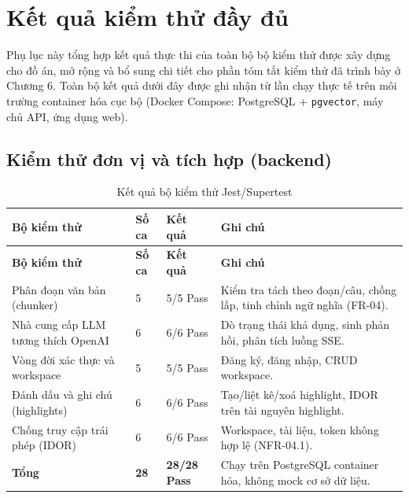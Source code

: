 \chapter{Kết quả kiểm thử đầy đủ}
Phụ lục này tổng hợp kết quả thực thi của toàn bộ bộ kiểm thử được xây dựng cho đồ án, mở rộng và bổ sung chi tiết cho phần tóm tắt kiểm thử đã trình bày ở Chương 6. Toàn bộ kết quả dưới đây được ghi nhận từ lần chạy thực tế trên môi trường container hóa cục bộ (Docker Compose: PostgreSQL + \texttt{pgvector}, máy chủ API, ứng dụng web).

\section{Kiểm thử đơn vị và tích hợp (backend)}
\begin{longtable}{|L{0.30\textwidth}|C{0.12\textwidth}|C{0.12\textwidth}|L{0.32\textwidth}|}
\caption{Kết quả bộ kiểm thử Jest/Supertest}\label{tab:appendix-unit-tests}\\
\hline
\textbf{Bộ kiểm thử} & \textbf{Số ca} & \textbf{Kết quả} & \textbf{Ghi chú} \\\hline
\endfirsthead
\hline
\textbf{Bộ kiểm thử} & \textbf{Số ca} & \textbf{Kết quả} & \textbf{Ghi chú} \\\hline
\endhead
Phân đoạn văn bản (chunker) & 5 & 5/5 Pass & Kiểm tra tách theo đoạn/câu, chồng lấp, tinh chỉnh ngữ nghĩa (FR-04). \\\hline
Nhà cung cấp LLM tương thích OpenAI & 6 & 6/6 Pass & Dò trạng thái khả dụng, sinh phản hồi, phân tích luồng SSE. \\\hline
Vòng đời xác thực và workspace & 5 & 5/5 Pass & Đăng ký, đăng nhập, CRUD workspace. \\\hline
Đánh dấu và ghi chú (highlights) & 6 & 6/6 Pass & Tạo/liệt kê/xoá highlight, IDOR trên tài nguyên highlight. \\\hline
Chống truy cập trái phép (IDOR) & 6 & 6/6 Pass & Workspace, tài liệu, token không hợp lệ (NFR-04.1). \\\hline
\textbf{Tổng} & \textbf{28} & \textbf{28/28 Pass} & Chạy trên PostgreSQL container hóa, không mock cơ sở dữ liệu. \\\hline
\end{longtable}

